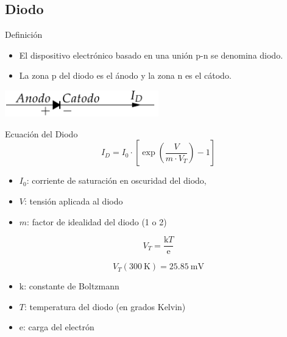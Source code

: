 \documentclass[xcolor={usenames,svgnames,dvipsnames}]{beamer}
\begin{document}
\subsection{Diodo}
\label{sec:org83674f9}

\begin{frame}[label={sec:org60ca4c4}]{Definición}
\begin{itemize}
\item El dispositivo electrónico basado en una unión p-n se denomina diodo.

\item La zona p del diodo es el ánodo y la zona n es el cátodo.
\end{itemize}
\begin{center}
\includegraphics[width=0.5\textwidth]{../figs/Diodo.pdf}
\end{center}
\end{frame}

\begin{frame}[label={sec:org808e0cf}]{Ecuación del Diodo}
\[
\boxed{I_{D}=I_{0}\cdot[\exp(\frac{V}{m\cdot V_{T}})-1]}
\] 

\begin{itemize}
\item \(I_{0}\): corriente de saturación en oscuridad del diodo,
\item \(V\): tensión aplicada al diodo
\item \(m\): factor de idealidad del diodo (1 o 2)
\end{itemize}

\[
V_{T}=\frac{\mathrm{k}T}{\mathrm{e}}
\] 

\[
V_T(\SI{300}{\kelvin}) = \SI{25.85}{\milli\volt}
\]

\begin{itemize}
\item \(\mathrm{k}\): constante de Boltzmann
\item \(T\): temperatura del diodo (en grados Kelvin)
\item \(\mathrm{e}\): carga del electrón
\end{itemize}
\end{frame}
\end{document}
